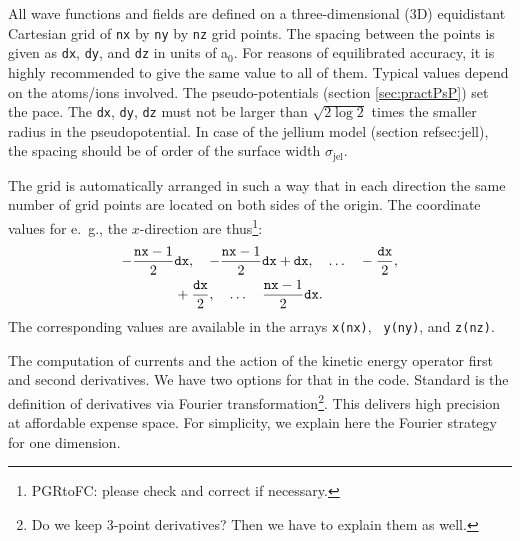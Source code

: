 \documentclass[final,1p]{elsarticle}
\newcommand{\PGRfoot}[1]{{\color{blue}\footnote{\color{blue} #1}}}
\begin{document}
All wave functions and fields are defined on a three-dimensional (3D)
equidistant Cartesian grid of {\tt nx} by {\tt ny} by {\tt nz} grid
points. 
The spacing between the points is given as {\tt dx}, {\tt dy}, and
{\tt dz} in units of a$_0$. For reasons of equilibrated accuracy, it
is highly recommended to give the same value to all of them.  Typical
values depend on the atoms/ions involved.  The pseudo-potentials
(section \ref{sec:practPsP}) set the pace. The {\tt dx}, {\tt dy},
{\tt dz} must not be larger than $\sqrt{2\log 2}$ times the smaller
radius in the pseudopotential. In case of the jellium model (section
ref{sec:jell}), the spacing should be of order of the surface width
$\sigma_\mathrm{jel}$.

The grid is automatically arranged in such a way that in each
direction the same number of grid points are located on both sides of
the origin. The coordinate values for e.~g., the $x$-direction are
thus\PGRfoot{PGRtoFC: please check and correct if necessary.}:
\begin{equation}\begin{split}
 -\frac{{\tt nx}-1}{2}&{\tt dx},\quad -\frac{{\tt nx}-1}{2}{\tt
  dx}+{\tt dx},\quad\ldots \quad -\frac{{\tt dx}}{2},\\
  &+\frac{{\tt  dx}}{2},\quad \ldots\quad \frac{{\tt nx}-1}{2}{\tt
    dx}. 
\end{split}
\end{equation}
The corresponding values are available in the arrays {\tt x(nx)}, {\tt
  y(ny)}, and {\tt z(nz)}.


The computation of currents and the action of the kinetic energy
operator first and second derivatives.  We have two options for that
in the code. Standard is the definition of derivatives via Fourier
transformation\PGRfoot{Do we keep 3-point derivatives? Then we have to
  explain them as well.}.  This delivers high precision at affordable
expense space. For simplicity, we explain here the Fourier strategy
for one dimension.
\end{document}
